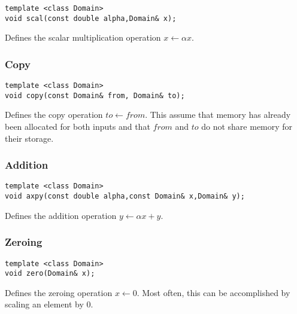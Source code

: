 \documentclass{article}
\begin{document}
\begin{flushleft}
\begin{lstlisting}
template <class Domain>
void scal(const double alpha,Domain& x);
\end{lstlisting}
\end{flushleft}

Defines the scalar multiplication operation $x\leftarrow \alpha x$. 

\subsubsection{Copy}

\begin{flushleft}
\begin{lstlisting}
template <class Domain>
void copy(const Domain& from, Domain& to);
\end{lstlisting}
\end{flushleft}

Defines the copy operation $to \leftarrow from$.  This assume that memory has already been allocated for both inputs and that $from$ and $to$ do not share memory for their storage.

\subsubsection{Addition}

\begin{flushleft}
\begin{lstlisting}
template <class Domain>
void axpy(const double alpha,const Domain& x,Domain& y);
\end{lstlisting}
\end{flushleft}

Defines the addition operation $y\leftarrow \alpha x+y$.

\subsubsection{Zeroing}

\begin{flushleft}
\begin{lstlisting}
template <class Domain>
void zero(Domain& x);
\end{lstlisting}
\end{flushleft}

Defines the zeroing operation $x\leftarrow 0$.  Most often, this can be accomplished by scaling an element by $0$.
\end{document}
